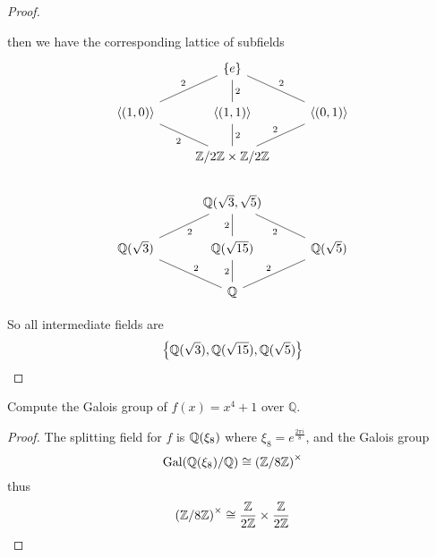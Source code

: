 \begin{proof}
\begin{itemize}
\begin{equation*}
        \end{equation*}
        then we have the corresponding lattice of subfields
        \[\begin{tikzcd}
            & {\{e\}} \\
            {\langle(1,0)\rangle} & {\langle(1,1)\rangle} & {\langle(0,1)\rangle} \\
            & {\Z/2\Z\times\Z/2\Z} \\
            & {\mathbb{Q}(\sqrt{3},\sqrt{5})} \\
            {\mathbb{Q}(\sqrt{3})} & {\mathbb{Q}(\sqrt{15})} & {\mathbb{Q}(\sqrt{5})} \\
            & {\mathbb{Q}}
            \arrow["2", no head, from=2-1, to=1-2]
            \arrow["2"', no head, from=2-1, to=3-2]
            \arrow["2"', no head, from=2-2, to=1-2]
            \arrow["2", no head, from=2-2, to=3-2]
            \arrow["2"', no head, from=2-3, to=1-2]
            \arrow["2", no head, from=3-2, to=2-3]
            \arrow["2"', no head, from=5-1, to=4-2]
            \arrow["2", no head, from=5-2, to=4-2]
            \arrow["2", no head, from=5-3, to=4-2]
            \arrow["2"', no head, from=6-2, to=5-1]
            \arrow["2", no head, from=6-2, to=5-2]
            \arrow["2", no head, from=6-2, to=5-3]
        \end{tikzcd}\]
    \end{itemize}
    So all intermediate fields are 
    \begin{equation*}
        \left\{\mathbb{Q}(\sqrt{3}), \mathbb{Q}(\sqrt{15}),\mathbb{Q}(\sqrt{5})\right\}
    \end{equation*}
\end{proof}




\begin{prob}[F2013-Q5]
    Compute the Galois group of \(f(x) = x^4 + 1\) over \(\mathbb{Q}\).
\end{prob}
\begin{proof}
    The splitting field for $f$ is $\mathbb{Q}(\xi_8)$ where $\xi_8=e^\frac{2\pi i}{8}$, and the Galois group 
    \begin{equation*}
        \text{Gal}(\mathbb{Q}(\xi_8)/\mathbb{Q})\cong\left(\mathbb{Z}/8\mathbb{Z}\right)^\times
    \end{equation*}
    thus
    \begin{equation*}
        \left(\mathbb{Z}/8\mathbb{Z}\right)^\times\cong\frac{\mathbb{Z}}{2\mathbb{Z}}\times\frac{\mathbb{Z}}{2\mathbb{Z}}
    \end{equation*}
\end{proof}



